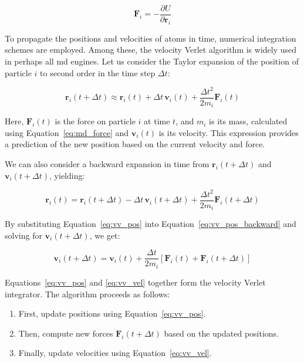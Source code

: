 \begin{equation}
    \mathbf{F}_i = -\frac{\partial U}{\partial \mathbf{r}_i}
    \label{eq:md_force}
\end{equation}

To propagate the positions and velocities of atoms in time, numerical integration schemes are employed. Among these, the velocity Verlet algorithm is widely used in perhaps all \ac{md} engines. Let us consider the Taylor expansion of the position of particle $i$ to second order in the time step $\Delta t$:

\begin{equation}
    \mathbf{r}_i(t + \Delta t) \approx \mathbf{r}_i(t) + \Delta t\, \mathbf{v}_i(t) + \frac{\Delta t^2}{2m_i} \mathbf{F}_i(t)
    \label{eq:vv_pos}
\end{equation}

Here, $\mathbf{F}_i(t)$ is the force on particle $i$ at time $t$, and $m_i$ is its mass, calculated using Equation~\ref{eq:md_force} and $\mathbf{v}_i(t)$ is its velocity. This expression provides a prediction of the new position based on the current velocity and force.

We can also consider a backward expansion in time from $\mathbf{r}_i(t + \Delta t)$ and $\mathbf{v}_i(t + \Delta t)$, yielding:

\begin{equation}
    \mathbf{r}_i(t) = \mathbf{r}_i(t + \Delta t) - \Delta t\, \mathbf{v}_i(t + \Delta t) + \frac{\Delta t^2}{2m_i} \mathbf{F}_i(t + \Delta t)
    \label{eq:vv_pos_backward}
\end{equation}

By substituting Equation~\ref{eq:vv_pos} into Equation~\ref{eq:vv_pos_backward} and solving for $\mathbf{v}_i(t + \Delta t)$, we get:

\begin{equation}
    \mathbf{v}_i(t + \Delta t) = \mathbf{v}_i(t) + \frac{\Delta t}{2m_i} \left[ \mathbf{F}_i(t) + \mathbf{F}_i(t + \Delta t) \right]
    \label{eq:vv_vel}
\end{equation}

Equations~\ref{eq:vv_pos} and \ref{eq:vv_vel} together form the velocity Verlet integrator. The algorithm proceeds as follows:
\begin{enumerate}
  \item First, update positions using Equation~\ref{eq:vv_pos}.
  \item Then, compute new forces $\mathbf{F}_i(t + \Delta t)$ based on the updated positions.
  \item Finally, update velocities using Equation~\ref{eq:vv_vel}.
\end{enumerate}

